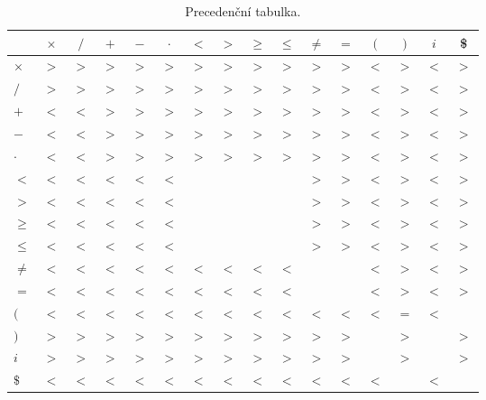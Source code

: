\documentclass[a4paper, 12pt]{article}
\begin{document}
    \begin{table}[h]
    \centering
    \begin{tabular}[p]{| l | c | c | c | c | c | c | c | c | c | c | c | c | c | c | c |}
        \hline
        &   \textbf{$\times$} & \textbf{$/$} & \textbf{$+$} & \textbf{$-$} & \textbf{$\cdot$} & \textbf{$<$} & \textbf{$>$} & \textbf{{$\geq$}} & \textbf{$\leq$} & \textbf{$\neq$} & \textbf{$=$} & \textbf{$($} & \textbf{$)$} & \textbf{$i$} & \textbf{\$} \\
        \hline
        \textbf{$\times$} &
            $>$ & $>$ & $>$ & $>$ & $>$ & $>$ & $>$ & $>$ & $>$ & $>$ & $>$ & $<$ & $>$ & $<$ & $>$ \\
        \textbf{$/$} &
            $>$ & $>$ & $>$ & $>$ & $>$ & $>$ & $>$ & $>$ & $>$ & $>$ & $>$ & $<$ & $>$ & $<$ & $>$ \\
        \textbf{$+$} &
            $<$ & $<$ & $>$ & $>$ & $>$ & $>$ & $>$ & $>$ & $>$ & $>$ & $>$ & $<$ & $>$ & $<$ & $>$ \\
        \textbf{$-$} &
            $<$ & $<$ & $>$ & $>$ & $>$ & $>$ & $>$ & $>$ & $>$ & $>$ & $>$ & $<$ & $>$ & $<$ & $>$ \\
        \textbf{$\cdot$} &
            $<$ & $<$ & $>$ & $>$ & $>$ & $>$ & $>$ & $>$ & $>$ & $>$ & $>$ & $<$ & $>$ & $<$ & $>$ \\
        \textbf{$<$} &
            $<$ & $<$ & $<$ & $<$ & $<$ &     &     &     &     & $>$ & $>$ & $<$ & $>$ & $<$ & $>$ \\
        \textbf{$>$} &
            $<$ & $<$ & $<$ & $<$ & $<$ &     &     &     &     & $>$ & $>$ & $<$ & $>$ & $<$ & $>$ \\
        \textbf{$\geq$} &
            $<$ & $<$ & $<$ & $<$ & $<$ &     &     &     &     & $>$ & $>$ & $<$ & $>$ & $<$ & $>$ \\
        \textbf{$\leq$} &
            $<$ & $<$ & $<$ & $<$ & $<$ &     &     &     &     & $>$ & $>$ & $<$ & $>$ & $<$ & $>$ \\
        \textbf{$\neq$} &
            $<$ & $<$ & $<$ & $<$ & $<$ & $<$ & $<$ & $<$ & $<$ &     &     & $<$ & $>$ & $<$ & $>$ \\
        \textbf{$=$} &
            $<$ & $<$ & $<$ & $<$ & $<$ & $<$ & $<$ & $<$ & $<$ &     &     & $<$ & $>$ & $<$ & $>$ \\
        \textbf{$($} &
            $<$ & $<$ & $<$ & $<$ & $<$ & $<$ & $<$ & $<$ & $<$ & $<$ & $<$ & $<$ & $=$ & $<$ &     \\ 
        \textbf{$)$} &
            $>$ & $>$ & $>$ & $>$ & $>$ & $>$ & $>$ & $>$ & $>$ & $>$ & $>$ &     & $>$ &     & $>$ \\ 
        \textbf{$i$} &
            $>$ & $>$ & $>$ & $>$ & $>$ & $>$ & $>$ & $>$ & $>$ & $>$ & $>$ &     & $>$ &     & $>$ \\ 
        \textbf{$\$$} &
            $<$ & $<$ & $<$ & $<$ & $<$ & $<$ & $<$ & $<$ & $<$ & $<$ & $<$ & $<$ &     & $<$ &     \\ 
        \hline
    \end{tabular}
    \caption{Precedenční tabulka.}
    \label{tabulka precedence}
\end{table}
\end{document}
